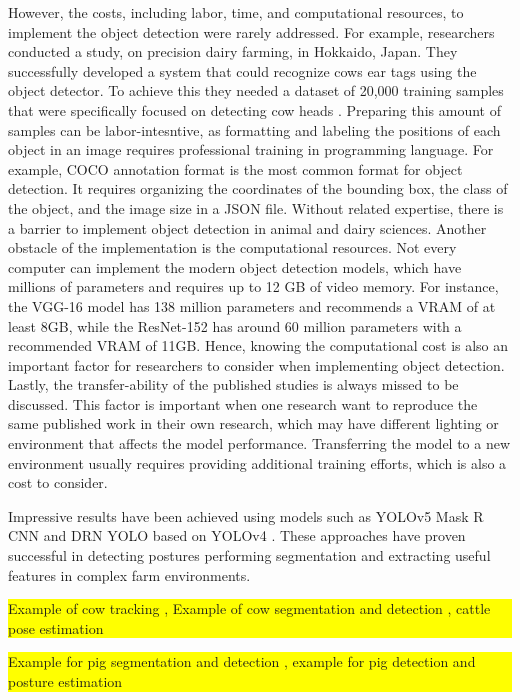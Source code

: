However, the costs, including labor, time, and computational resources, to implement the object detection were rarely addressed. For example, researchers conducted a study, on precision dairy farming, in Hokkaido, Japan. They successfully developed a system that could recognize cows ear tags using the object detector. To achieve this they needed a dataset of 20,000 training samples that were specifically focused on detecting cow heads \cite{zin2020cow}. Preparing this amount of samples can be labor-intesntive, as formatting and labeling the positions of each object in an image requires professional training in programming language. For example, COCO annotation \cite{lin2014microsoft} format is the most common format for object detection. It requires organizing the coordinates of the bounding box, the class of the object, and the image size in a JSON file. Without related expertise, there is a barrier to implement object detection in animal and dairy sciences. Another obstacle of the implementation is the computational resources. Not every computer can implement the modern object detection models, which have millions of parameters and requires up to 12 GB of video memory. For instance, the VGG-16 model \cite{simonyan2014very} has 138 million parameters and recommends a VRAM of at least 8GB, while the ResNet-152 \cite{he2016deep} has around 60 million parameters with a recommended VRAM of 11GB. Hence, knowing the computational cost is also an important factor for researchers to consider when implementing object detection. Lastly, the transfer-ability of the published studies is always missed to be discussed. This factor is important when one research want to reproduce the same published work in their own research, which may have different lighting or environment that affects the model performance. Transferring the model to a new environment usually requires providing additional training efforts, which is also a cost to consider.

Impressive results have been achieved using models such as YOLOv5 \cite{witte2022introducing} Mask R CNN \cite{qiao2019cattle} and DRN YOLO based on YOLOv4 \cite{zin2020cow}. These approaches have proven successful in detecting postures performing segmentation and extracting useful features in complex farm environments. 

\colorbox{yellow}{%
    \parbox{\dimexpr\textwidth-2\fboxsep\relax}{%
        Example of cow tracking \cite{guzhva2018now}, Example of cow segmentation and detection \cite{salau2020instance}, cattle pose estimation \cite{li2019deep}%
    }%
}
\colorbox{yellow}{%
    \parbox{\dimexpr\textwidth-2\fboxsep\relax}{%
        Example for pig segmentation and detection \cite{tu2021automatic}, example for pig detection and posture estimation \cite{riekert2020automatically}%
    }%
}



